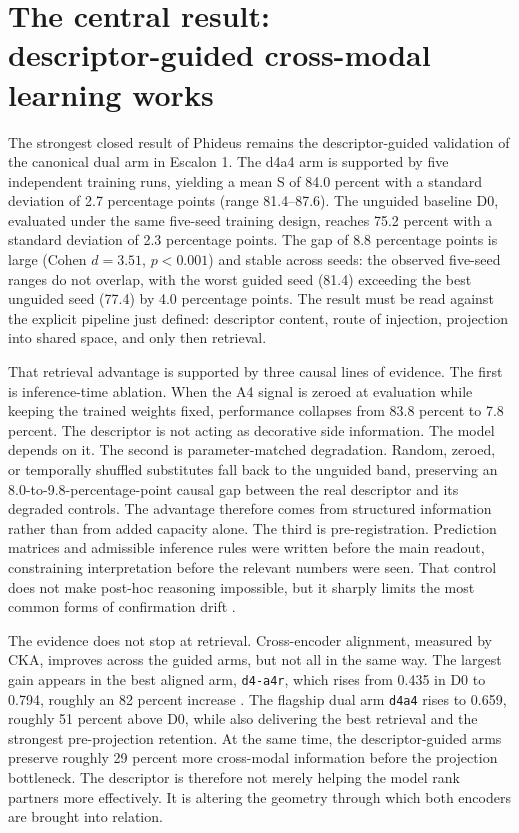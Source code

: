 \section[The central result: descriptor-guided cross-modal learning works]{The central result:\texorpdfstring{\\}{ }descriptor-guided cross-modal learning works}


The strongest closed result of Phideus remains the descriptor-guided validation of the canonical dual arm in Escalon 1. The d4a4 arm is supported by five independent training runs, yielding a mean S of 84.0 percent with a standard deviation of 2.7 percentage points (range 81.4--87.6). The unguided baseline D0, evaluated under the same five-seed training design, reaches 75.2 percent with a standard deviation of 2.3 percentage points. The gap of 8.8 percentage points is large (Cohen $d = 3.51$, $p < 0.001$) and stable across seeds: the observed five-seed ranges do not overlap, with the worst guided seed (81.4) exceeding the best unguided seed (77.4) by 4.0 percentage points. The result must be read against the explicit pipeline just defined: descriptor content, route of injection, projection into shared space, and only then retrieval.

That retrieval advantage is supported by three causal lines of evidence. The first is inference-time ablation. When the A4 signal is zeroed at evaluation while keeping the trained weights fixed, performance collapses from 83.8 percent to 7.8 percent. The descriptor is not acting as decorative side information. The model depends on it. The second is parameter-matched degradation. Random, zeroed, or temporally shuffled substitutes fall back to the unguided band, preserving an 8.0-to-9.8-percentage-point causal gap between the real descriptor and its degraded controls. The advantage therefore comes from structured information rather than from added capacity alone. The third is pre-registration. Prediction matrices and admissible inference rules were written before the main readout, constraining interpretation before the relevant numbers were seen. That control does not make post-hoc reasoning impossible, but it sharply limits the most common forms of confirmation drift \parencite{pearl_2009}.

The evidence does not stop at retrieval. Cross-encoder alignment, measured by CKA, improves across the guided arms, but not all in the same way. The largest gain appears in the best aligned arm, \texttt{d4-a4r}, which rises from 0.435 in D0 to 0.794, roughly an 82 percent increase \parencite{kornblith_2019}. The flagship dual arm \texttt{d4a4} rises to 0.659, roughly 51 percent above D0, while also delivering the best retrieval and the strongest pre-projection retention. At the same time, the descriptor-guided arms preserve roughly 29 percent more cross-modal information before the projection bottleneck. The descriptor is therefore not merely helping the model rank partners more effectively. It is altering the geometry through which both encoders are brought into relation.

